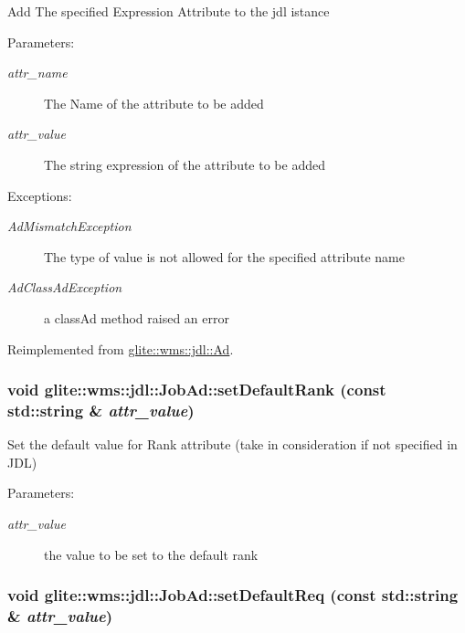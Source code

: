 Add The specified Expression Attribute to the jdl istance \begin{Desc}
\item[Parameters:]
\begin{description}
\item[{\em attr\_\-name}]The Name of the attribute to be added \item[{\em attr\_\-value}]The string expression of the attribute to be added \end{description}
\end{Desc}
\begin{Desc}
\item[Exceptions:]
\begin{description}
\item[{\em Ad\-Mismatch\-Exception}]The type of value is not allowed for the specified attribute name \item[{\em Ad\-Class\-Ad\-Exception}]a class\-Ad method raised an error \end{description}
\end{Desc}


Reimplemented from \hyperlink{classglite_1_1wms_1_1jdl_1_1Ad_z19_8}{glite::wms::jdl::Ad}.\hypertarget{classglite_1_1wms_1_1jdl_1_1JobAd_z5_0}{
\subsubsection[setDefaultRank]{\setlength{\rightskip}{0pt plus 5cm}void glite::wms::jdl::Job\-Ad::set\-Default\-Rank (const std::string \& {\em attr\_\-value})}}
\label{classglite_1_1wms_1_1jdl_1_1JobAd_z5_0}


Set the default value for Rank attribute (take in consideration if not specified in JDL) \begin{Desc}
\item[Parameters:]
\begin{description}
\item[{\em attr\_\-value}]the value to be set to the default rank\end{description}
\end{Desc}
\hypertarget{classglite_1_1wms_1_1jdl_1_1JobAd_z5_1}{
\subsubsection[setDefaultReq]{\setlength{\rightskip}{0pt plus 5cm}void glite::wms::jdl::Job\-Ad::set\-Default\-Req (const std::string \& {\em attr\_\-value})}}
\label{classglite_1_1wms_1_1jdl_1_1JobAd_z5_1}



